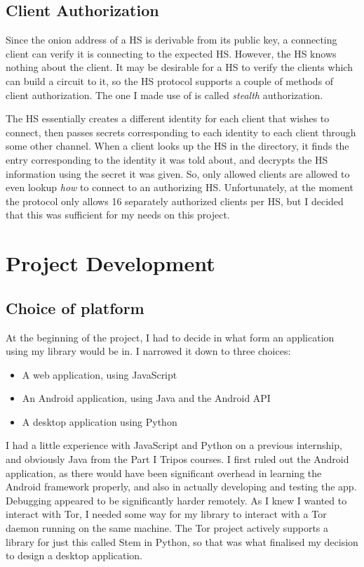 \documentclass[diss.tex]{subfiles}
\begin{document}
\subsection{Client Authorization}

Since the onion address of a HS is derivable from its public key, a connecting client can verify it is connecting to the expected HS. However, the HS knows nothing about the client. It may be desirable for a HS to verify the clients which can build a circuit to it, so the HS protocol supports a couple of methods of client authorization. The one I made use of is called \textit{stealth} authorization.

The HS essentially creates a different identity for each client that wishes to connect, then passes secrets corresponding to each identity to each client through some other channel. When a client looks up the HS in the directory, it finds the entry corresponding to the identity it was told about, and decrypts the HS information using the secret it was given. So, only allowed clients are allowed to even lookup \textit{how} to connect to an authorizing HS. Unfortunately, at the moment the protocol only allows 16 separately authorized clients per HS, but I decided that this was sufficient for my needs on this project.

\section{Project Development}

\subsection{Choice of platform}
At the beginning of the project, I had to decide in what form an application using my library would be in. I narrowed it down to three choices:
\begin{itemize}
\item A web application, using JavaScript
\item An Android application, using Java and the Android API
\item A desktop application using Python
\end{itemize}

I had a little experience with JavaScript and Python on a previous internship, and obviously Java from the Part I Tripos courses. I first ruled out the Android application, as there would have been significant overhead in learning the Android framework properly, and also in actually developing and testing the app. Debugging appeared to be significantly harder remotely. As I knew I wanted to interact with Tor, I needed some way for my library to interact with a Tor daemon running on the same machine. The Tor project actively supports a library for just this called Stem in Python, so that was what finalised my decision to design a desktop application.
\end{document}
